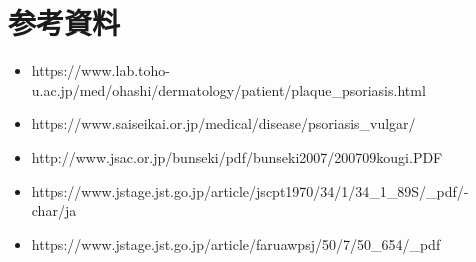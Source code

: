 \documentclass[a4paper,papersize,dvipdfmx]{jsarticle}
\begin{document}
\section*{参考資料}
\footnotesize

\begin{itemize}
\item https://www.lab.toho-u.ac.jp/med/ohashi/dermatology/patient/plaque\_psoriasis.html
\item https://www.saiseikai.or.jp/medical/disease/psoriasis\_vulgar/
\item http://www.jsac.or.jp/bunseki/pdf/bunseki2007/200709kougi.PDF
\item https://www.jstage.jst.go.jp/article/jscpt1970/34/1/34\_1\_89S/\_pdf/-char/ja
\item https://www.jstage.jst.go.jp/article/faruawpsj/50/7/50\_654/\_pdf
\end{itemize}
\end{document}
